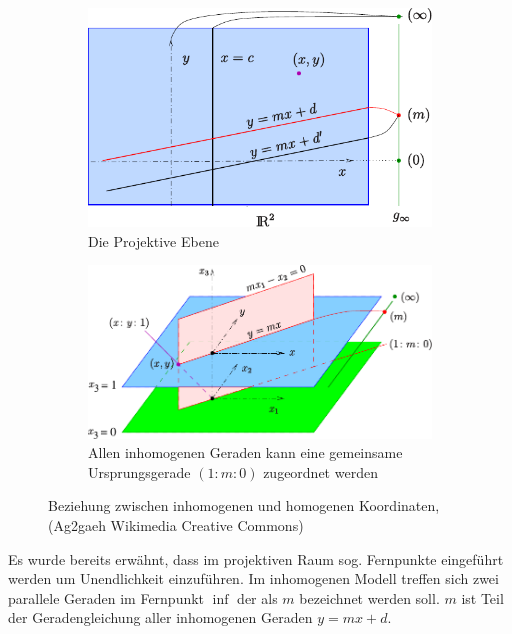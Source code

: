 \begin{figure}[!ht]
  \centering
  \begin{subfigure}[t]{0.4\textwidth}
    \centering
    \includegraphics[width=\textwidth]{pictures/02_Projebeneinhomkoords.pdf}
    \caption[Projektive Ebene]{Die Projektive Ebene}
    \label{fig:y equals x}
  \end{subfigure}
  \hfill
  \begin{subfigure}[t]{0.55\textwidth}
    \centering
    \includegraphics[width=\textwidth]{pictures/02_Projebenehomkoords.pdf}
    \caption[Urspungsgerade der inhomogenen Koordinaten]{Allen inhomogenen Geraden kann eine gemeinsame Ursprungsgerade $(1:m:0)$ zugeordnet werden}
    \label{fig:three sin x}
  \end{subfigure}
  \caption[Beziehung zwischen inhomogenen und homogenen Koordinaten]{Beziehung zwischen inhomogenen und homogenen Koordinaten, (Ag2gaeh Wikimedia Creative Commons)}
     \label{fig:three graphs}
\end{figure}

%
Es wurde bereits erwähnt, dass im projektiven Raum sog. Fernpunkte eingeführt werden um Unendlichkeit einzuführen. Im inhomogenen Modell treffen sich zwei parallele Geraden im Fernpunkt $\inf$ der als $m$ bezeichnet werden soll. $m$ ist Teil der Geradengleichung aller inhomogenen Geraden $y = mx + d$. 

